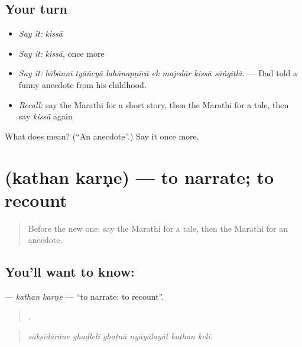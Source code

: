 \subsection*{Your turn}
\begin{itemize}
\raggedright
  \item \emph{Say it:} \emph{kissā}
  \item \emph{Say it:} \emph{kissā}, once more
  \item \emph{Say it:} \emph{bābānnī tyāñcyā lahānapṇīcā ek majedār kissā sāṅgitlā.} — Dad told a funny anecdote from his childhood.
  \item \emph{Recall:} say the Marathi for a short story, then the Marathi for a tale, then say \emph{kissā} again
\end{itemize}

\begin{tcolorbox}[breakable,colback=teal!4,colframe=teal!35!black,title={Before you move on}]
What does  mean? (\textquotedblleft{}An anecdote\textquotedblright{}.) Say it once more.
\end{tcolorbox}
\section[\texorpdfstring{\mr{कथन} \mr{करणे} (kathan karṇe)}{कथन करणे (kathan karṇe)}]{  (kathan karṇe) — to narrate; to recount}

\label{lesson:MR-C303-kathan-karne}



\begin{quote}
Before the new one: say the Marathi for a tale, then the Marathi for an anecdote.
\end{quote}

\subsection*{You'll want to know:  }
\textbf{ } — \emph{kathan karṇe} — \textquotedblleft{}to narrate; to recount\textquotedblright{}.

\begin{quote}
     .
\end{quote}

\begin{quote}
\emph{sākṣīdārāne ghaḍlelī ghaṭnā nyāyālayāt kathan kelī.}
\end{quote}

